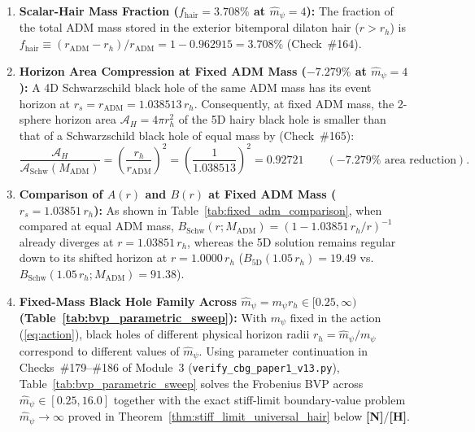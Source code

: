 \documentclass[11pt,a4paper]{article}
\newcommand{\catH}{\textbf{\textcolor{orange!85!black}{[H]}}}
\newcommand{\catN}{\textbf{\textcolor{teal!75!black}{[N]}}}
\theoremstyle{definition}
\theoremstyle{remark}
\begin{document}
\begin{enumerate}
  \item \textbf{Scalar-Hair Mass Fraction ($f_{\text{hair}} = 3.708\%$ at $\hat{m}_{\psi} = 4$):} The fraction of the total ADM mass stored in the exterior bitemporal dilaton hair ($r > r_h$) is $f_{\text{hair}} \equiv (r_{\text{ADM}} - r_h)/r_{\text{ADM}} = 1 - 0.962915 = \mathbf{3.708\%}$ (Check~\#164).
  \item \textbf{Horizon Area Compression at Fixed ADM Mass ($-7.279\%$ at $\hat{m}_{\psi} = 4$):} A 4D Schwarzschild black hole of the same ADM mass has its event horizon at $r_s = r_{\text{ADM}} = 1.038513\,r_h$. Consequently, at fixed ADM mass, the 2-sphere horizon area $\mathcal{A}_H = 4\pi r_h^2$ of the 5D hairy black hole is smaller than that of a Schwarzschild black hole of equal mass by (Check~\#165):
  \begin{equation}
    \frac{\mathcal{A}_H}{\mathcal{A}_{\text{Schw}}(M_{\text{ADM}})} = \left(\frac{r_h}{r_{\text{ADM}}}\right)^2 = \left(\frac{1}{1.038513}\right)^2 = \mathbf{0.92721} \qquad (\mathbf{-7.279\%}\text{ area reduction}).
    \label{eq:horizon_area_compression}
  \end{equation}
  \item \textbf{Comparison of $A(r)$ and $B(r)$ at Fixed ADM Mass ($r_s = 1.03851\,r_h$):} As shown in Table~\ref{tab:fixed_adm_comparison}, when compared at equal ADM mass, $B_{\text{Schw}}(r; M_{\text{ADM}}) = (1 - 1.03851\,r_h/r)^{-1}$ already diverges at $r = 1.03851\,r_h$, whereas the 5D solution remains regular down to its shifted horizon at $r = 1.0000\,r_h$ ($B_{\text{5D}}(1.05\,r_h) = 19.49$ vs.\ $B_{\text{Schw}}(1.05\,r_h; M_{\text{ADM}}) = 91.38$).
  \item \textbf{Fixed-Mass Black Hole Family Across $\hat{m}_{\psi} = m_{\psi}r_h \in [0.25, \infty)$ (Table~\ref{tab:bvp_parametric_sweep}):} With $m_{\psi}$ fixed in the action (\ref{eq:action}), black holes of different physical horizon radii $r_h = \hat{m}_{\psi}/m_{\psi}$ correspond to different values of $\hat{m}_{\psi}$. Using parameter continuation in Checks~\#179--\#186 of Module~3 (\allowbreak\texttt{verify\_cbg\_paper1\_v13.py}), Table~\ref{tab:bvp_parametric_sweep} solves the Frobenius BVP across $\hat{m}_{\psi} \in [0.25, 16.0]$ together with the exact stiff-limit boundary-value problem $\hat{m}_{\psi} \to \infty$ proved in Theorem~\ref{thm:stiff_limit_universal_hair} below \catN/\catH.
\end{enumerate}
\end{document}
